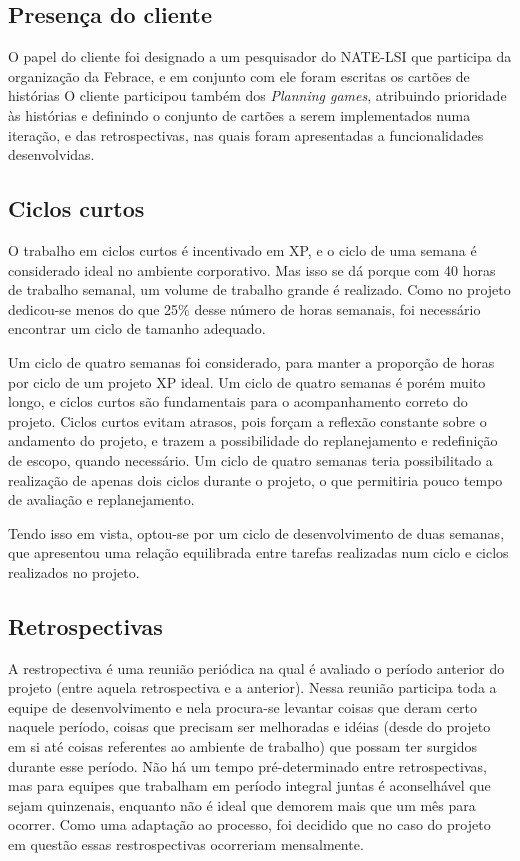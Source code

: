   \subsection{Presença do cliente}
    O papel do cliente foi designado a um pesquisador do NATE-LSI que participa da organização da Febrace, e em conjunto com ele foram escritas os cartões de histórias O cliente participou também dos \textit{Planning games}, atribuindo prioridade às histórias e definindo o conjunto de cartões a serem implementados numa iteração, e das retrospectivas, nas quais foram apresentadas a funcionalidades desenvolvidas.

  \subsection{Ciclos curtos}
    O trabalho em ciclos curtos é incentivado em XP, e o ciclo de uma semana é considerado ideal no ambiente corporativo. Mas isso se dá porque com 40 horas de trabalho semanal, um volume de trabalho grande é realizado. Como no projeto dedicou-se menos do que 25\% desse número de horas semanais, foi necessário encontrar um ciclo de tamanho adequado.

    Um ciclo de quatro semanas foi considerado, para manter a proporção de horas por ciclo de um projeto XP ideal. Um ciclo de quatro semanas é porém muito longo, e ciclos curtos são fundamentais para o acompanhamento correto do projeto. Ciclos curtos evitam atrasos, pois forçam a reflexão constante sobre o andamento do projeto, e trazem a possibilidade do replanejamento e redefinição de escopo, quando necessário. Um ciclo de quatro semanas teria possibilitado a realização de apenas dois ciclos durante o projeto, o que permitiria pouco tempo de avaliação e replanejamento.

  Tendo isso em vista, optou-se por um ciclo de desenvolvimento de duas semanas, que apresentou uma relação equilibrada entre tarefas realizadas num ciclo e ciclos realizados no projeto.

  \subsection{Retrospectivas}
    A restropectiva é uma reunião periódica na qual é avaliado o período anterior do projeto (entre aquela retrospectiva e a anterior). Nessa reunião participa toda a equipe de desenvolvimento e nela procura-se levantar coisas que deram certo naquele período, coisas que precisam ser melhoradas e idéias (desde do projeto em si até coisas referentes ao ambiente de trabalho) que possam ter surgidos durante esse período. Não há um tempo pré-determinado entre retrospectivas, mas para equipes que trabalham em período integral juntas é aconselhável que sejam quinzenais, enquanto não é ideal que demorem mais que um mês para ocorrer. Como uma adaptação ao processo, foi decidido que no caso do projeto em questão essas restrospectivas ocorreriam mensalmente.

